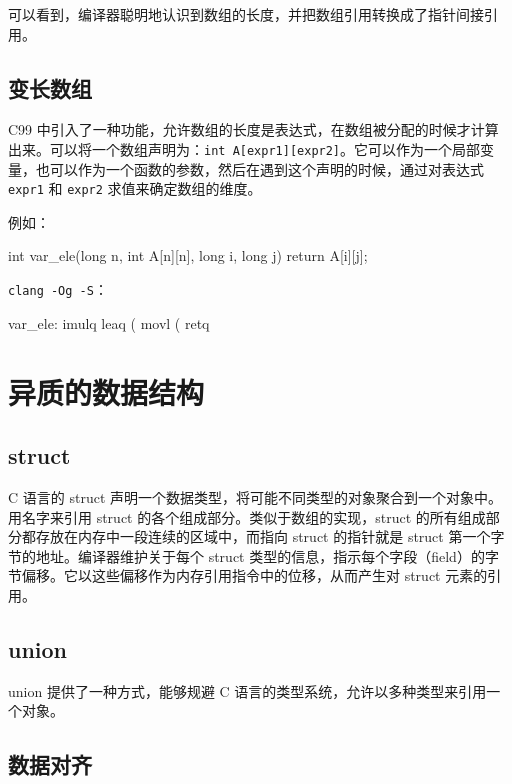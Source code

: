 可以看到，编译器聪明地认识到数组的长度，并把数组引用转换成了指针间接引用。

\subsection{变长数组}

C99 中引入了一种功能，允许数组的长度是表达式，在数组被分配的时候才计算出来。可以将一个数组声明为：\verb|int A[expr1][expr2]|。它可以作为一个局部变量，也可以作为一个函数的参数，然后在遇到这个声明的时候，通过对表达式 \verb|expr1| 和 \verb|expr2| 求值来确定数组的维度。

例如：
\begin{cppcode}
int var_ele(long n, int A[n][n], long i, long j) {
  return A[i][j];
}
\end{cppcode}
\verb|clang -Og -S|：
\begin{gascode}
var_ele:
    imulq   %
    leaq    (%
    movl    (%
    retq
\end{gascode}

\section{异质的数据结构}

\subsection{struct}

C 语言的 struct 声明一个数据类型，将可能不同类型的对象聚合到一个对象中。用名字来引用 struct 的各个组成部分。类似于数组的实现，struct 的所有组成部分都存放在内存中一段连续的区域中，而指向 struct 的指针就是 struct 第一个字节的地址。编译器维护关于每个 struct 类型的信息，指示每个字段（field）的字节偏移。它以这些偏移作为内存引用指令中的位移，从而产生对 struct 元素的引用。

\subsection{union}

union 提供了一种方式，能够规避 C 语言的类型系统，允许以多种类型来引用一个对象。

\subsection{数据对齐}

